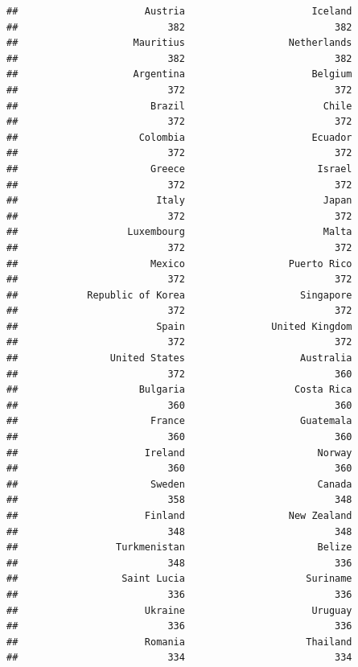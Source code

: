 \documentclass[]{article}
\begin{document}
\begin{verbatim}
##                      Austria                      Iceland 
##                          382                          382 
##                    Mauritius                  Netherlands 
##                          382                          382 
##                    Argentina                      Belgium 
##                          372                          372 
##                       Brazil                        Chile 
##                          372                          372 
##                     Colombia                      Ecuador 
##                          372                          372 
##                       Greece                       Israel 
##                          372                          372 
##                        Italy                        Japan 
##                          372                          372 
##                   Luxembourg                        Malta 
##                          372                          372 
##                       Mexico                  Puerto Rico 
##                          372                          372 
##            Republic of Korea                    Singapore 
##                          372                          372 
##                        Spain               United Kingdom 
##                          372                          372 
##                United States                    Australia 
##                          372                          360 
##                     Bulgaria                   Costa Rica 
##                          360                          360 
##                       France                    Guatemala 
##                          360                          360 
##                      Ireland                       Norway 
##                          360                          360 
##                       Sweden                       Canada 
##                          358                          348 
##                      Finland                  New Zealand 
##                          348                          348 
##                 Turkmenistan                       Belize 
##                          348                          336 
##                  Saint Lucia                     Suriname 
##                          336                          336 
##                      Ukraine                      Uruguay 
##                          336                          336 
##                      Romania                     Thailand 
##                          334                          334 

\end{verbatim}
\end{document}
